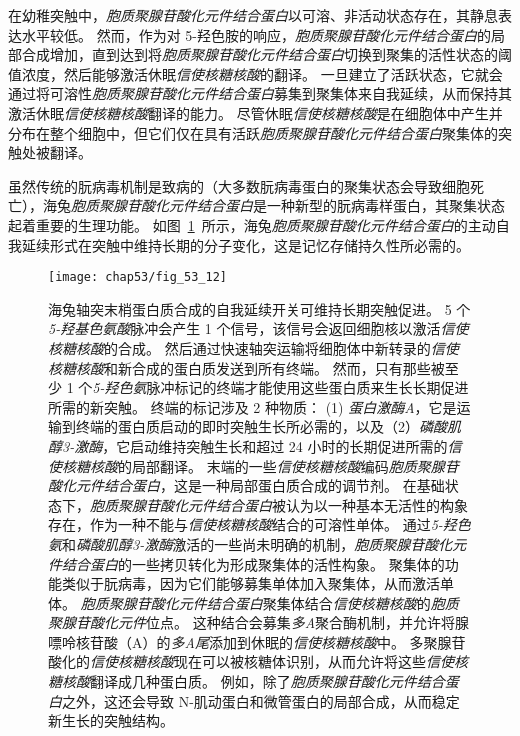 在幼稚突触中，\textit{胞质聚腺苷酸化元件结合蛋白}以可溶、非活动状态存在，其静息表达水平较低。
然而，作为对 5-羟色胺的响应，\textit{胞质聚腺苷酸化元件结合蛋白}的局部合成增加，直到达到将\textit{胞质聚腺苷酸化元件结合蛋白}切换到聚集的活性状态的阈值浓度，然后能够激活休眠\textit{信使核糖核酸}的翻译。
一旦建立了活跃状态，它就会通过将可溶性\textit{胞质聚腺苷酸化元件结合蛋白}募集到聚集体来自我延续，从而保持其激活休眠\textit{信使核糖核酸}翻译的能力。
尽管休眠\textit{信使核糖核酸}是在细胞体中产生并分布在整个细胞中，但它们仅在具有活跃\textit{胞质聚腺苷酸化元件结合蛋白}聚集体的突触处被翻译。


虽然传统的朊病毒机制是致病的（大多数朊病毒蛋白的聚集状态会导致细胞死亡），海兔\textit{胞质聚腺苷酸化元件结合蛋白}是一种新型的朊病毒样蛋白，其聚集状态起着重要的生理功能。
如图~\ref{fig:53_12}~所示，海兔\textit{胞质聚腺苷酸化元件结合蛋白}的主动自我延续形式在突触中维持长期的分子变化，这是记忆存储持久性所必需的。


\begin{figure}[htbp]
	\centering
	\texttt{[image: chap53/fig\_53\_12]}
	\caption{海兔轴突末梢蛋白质合成的自我延续开关可维持长期突触促进。
		5 个\textit{5-羟基色氨酸}脉冲会产生 1 个信号，该信号会返回细胞核以激活\textit{信使核糖核酸}的合成。
		然后通过快速轴突运输将细胞体中新转录的\textit{信使核糖核酸}和新合成的蛋白质发送到所有终端。
		然而，只有那些被至少 1 个\textit{5-羟色氨}脉冲标记的终端才能使用这些蛋白质来生长长期促进所需的新突触。
		终端的标记涉及 2 种物质：
		(1) \textit{蛋白激酶A}，它是运输到终端的蛋白质启动的即时突触生长所必需的，以及（2）\textit{磷酸肌醇3-激酶}，它启动维持突触生长和超过 24 小时的长期促进所需的\textit{信使核糖核酸}的局部翻译。
		末端的一些\textit{信使核糖核酸}编码\textit{胞质聚腺苷酸化元件结合蛋白}，这是一种局部蛋白质合成的调节剂。
		在基础状态下，\textit{胞质聚腺苷酸化元件结合蛋白}被认为以一种基本无活性的构象存在，作为一种不能与\textit{信使核糖核酸}结合的可溶性单体。
		通过\textit{5-羟色氨}和\textit{磷酸肌醇3-激酶}激活的一些尚未明确的机制，\textit{胞质聚腺苷酸化元件结合蛋白}的一些拷贝转化为形成聚集体的活性构象。
		聚集体的功能类似于朊病毒，因为它们能够募集单体加入聚集体，从而激活单体。
		\textit{胞质聚腺苷酸化元件结合蛋白}聚集体结合\textit{信使核糖核酸}的\textit{胞质聚腺苷酸化元件}位点。
		这种结合会募集\textit{多A}聚合酶机制，并允许将腺嘌呤核苷酸（A）的\textit{多A尾}添加到休眠的\textit{信使核糖核酸}中。
		多聚腺苷酸化的\textit{信使核糖核酸}现在可以被核糖体识别，从而允许将这些\textit{信使核糖核酸}翻译成几种蛋白质。
		例如，除了\textit{胞质聚腺苷酸化元件结合蛋白}之外，这还会导致 N-肌动蛋白和微管蛋白的局部合成，从而稳定新生长的突触结构\cite{bailey2004persistence}。}
	\label{fig:53_12}
\end{figure}


